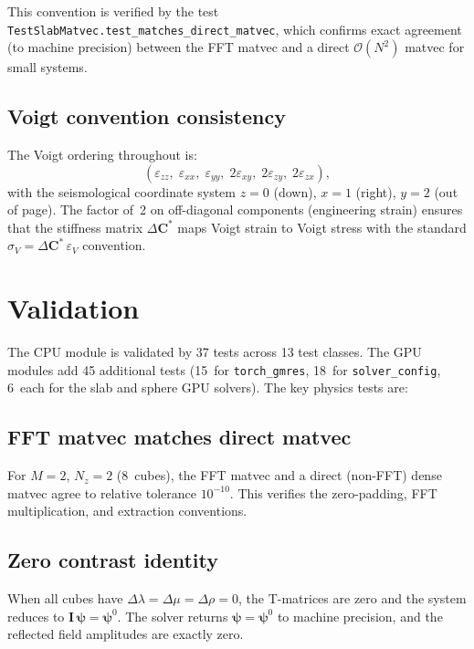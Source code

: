 \documentclass[11pt,a4paper]{article}
\newcommand{\D}{\Delta}
\newcommand{\order}{\mathcal{O}}
\newcommand{\bI}{\bm{I}}
\newcommand{\bC}{\bm{C}}
\begin{document}
This convention is verified by the test
\texttt{TestSlabMatvec.test\_matches\_direct\_matvec}, which
confirms exact agreement (to machine precision) between the FFT
matvec and a direct $\order(N^2)$ matvec for small systems.

\subsection{Voigt convention consistency}

The Voigt ordering throughout is:
\begin{equation}
  (\varepsilon_{zz},\;\varepsilon_{xx},\;\varepsilon_{yy},\;
   2\varepsilon_{xy},\;2\varepsilon_{zy},\;2\varepsilon_{zx}),
\end{equation}
with the seismological coordinate system $z = 0$ (down),
$x = 1$ (right), $y = 2$ (out of page).  The factor of~2 on
off-diagonal components (engineering strain) ensures that the
stiffness matrix $\D\bC^*$ maps Voigt strain to Voigt stress
with the standard $\sigma_V = \D\bC^*\,\varepsilon_V$ convention.

\section{Validation}
\label{sec:validation}

The CPU module is validated by 37 tests across 13 test classes.
The GPU modules add 45 additional tests (15~for \texttt{torch\_gmres},
18~for \texttt{solver\_config}, 6~each for the slab and sphere GPU
solvers).  The key physics tests are:

\subsection{FFT matvec matches direct matvec}

For $M = 2$, $N_z = 2$ (8~cubes), the FFT matvec and a direct
(non-FFT) dense matvec agree to relative tolerance $10^{-10}$.
This verifies the zero-padding, FFT multiplication, and extraction
conventions.

\subsection{Zero contrast identity}

When all cubes have $\D\lambda = \D\mu = \D\rho = 0$, the T-matrices
are zero and the system reduces to $\bI\,\bm{\psi} = \bm{\psi}^0$.
The solver returns $\bm{\psi} = \bm{\psi}^0$ to machine precision,
and the reflected field amplitudes are exactly zero.
\end{document}
